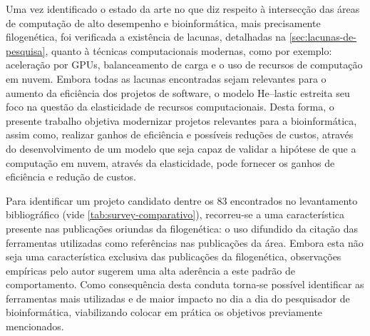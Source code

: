 \documentclass[english,brazilian]{UNISINOSmonografia} %
\begin{document}
Uma vez identificado o estado da arte no que diz respeito à intersecção das áreas de computação de alto desempenho e bioinformática, mais precisamente filogenética, foi verificada a existência de lacunas, detalhadas na \autoref{sec:lacunas-de-pesquisa}, quanto à técnicas computacionais modernas, como por exemplo: aceleração por GPUs, balanceamento de carga e o uso de recursos de computação em nuvem.
Embora todas as lacunas encontradas sejam relevantes para o aumento da eficiência dos projetos de software, o modelo \textsf{He}--lastic estreita seu foco na questão da elasticidade de recursos computacionais.
Desta forma, o presente trabalho objetiva modernizar projetos relevantes para a bioinformática, assim como, realizar ganhos de eficiência e possíveis reduções de custos, através do desenvolvimento de um modelo que seja capaz de validar a hipótese de que a computação em nuvem, através da elasticidade, pode fornecer os ganhos de eficiência e redução de custos.


Para identificar um projeto candidato dentre os 83 encontrados no levantamento bibliográfico (vide \autoref{tab:survey-comparativo}), recorreu-se a uma característica presente nas publicações oriundas da filogenética: o uso difundido da citação das ferramentas utilizadas como referências nas publicações da área.
Embora esta não seja uma característica exclusiva das publicações da filogenética, observações empíricas pelo autor sugerem uma alta aderência a este padrão de comportamento.
Como consequência desta conduta torna-se possível identificar as ferramentas mais utilizadas e de maior impacto no dia a dia do pesquisador de bioinformática, viabilizando colocar em prática os objetivos previamente mencionados.
\end{document}
